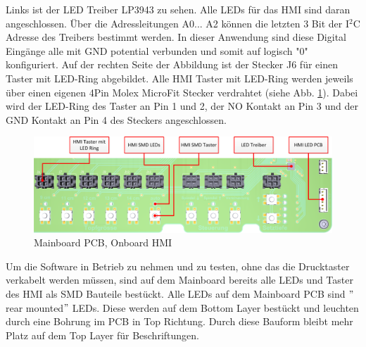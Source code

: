 Links ist der LED Treiber LP3943 zu sehen. Alle LEDs für das HMI sind daran angeschlossen. Über die Adressleitungen A0... A2 können die letzten 3 Bit der I$^{2}$C Adresse des Treibers bestimmt werden. In dieser Anwendung sind diese Digital Eingänge alle mit GND potential verbunden und somit auf logisch "0" konfiguriert. Auf der rechten Seite der Abbildung ist der Stecker J6 für einen Taster mit LED-Ring abgebildet. Alle HMI Taster mit LED-Ring werden jeweils über einen eigenen 4Pin Molex MicroFit Stecker verdrahtet (siehe Abb. \ref{fig:Mainboard_HMI_Layout}). Dabei wird der LED-Ring des Taster an Pin 1 und 2, der NO Kontakt an Pin 3 und der GND Kontakt an Pin 4 des Steckers angeschlossen.

\begin{figure}[H]
	\includegraphics[width=1\textwidth]{Illustrationen/6-Umsetzung/HMI_Layout.png}
	\caption{Mainboard PCB, Onboard HMI}
	\label{fig:Mainboard_HMI_Layout}
\end{figure}

 Um die Software in Betrieb zu nehmen und zu testen, ohne das die Drucktaster verkabelt werden müssen, sind auf dem Mainboard bereits alle LEDs und Taster des HMI als SMD Bauteile bestückt. Alle LEDs auf dem Mainboard PCB sind $"$rear mounted$"$ LEDs. Diese werden auf dem Bottom Layer bestückt und leuchten durch eine Bohrung im PCB in Top Richtung. Durch diese Bauform bleibt mehr Platz auf dem Top Layer für Beschriftungen.




